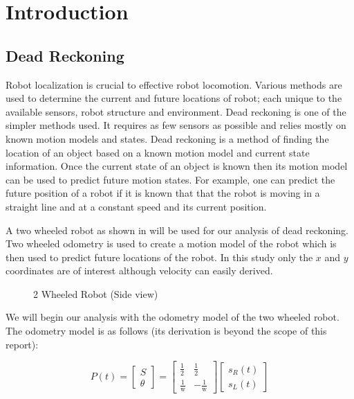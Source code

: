 \documentclass[main.tex]{subfiles}
\begin{document}
\section{Introduction}

\subsection{Dead Reckoning}


Robot localization is crucial to effective robot locomotion. Various methods are
used to determine the current and future locations of robot; each unique to the
available sensors, robot structure and environment. Dead reckoning is one of the
simpler methods used. It requires as few sensors as possible and relies mostly
on known motion models and states.  Dead reckoning is a method of finding the
location of an object based on a known motion model and current state
information. Once the current state of an object is known then its motion model
can be used to predict future motion states. For example, one can predict the
future position of a robot if it is known that that the robot is moving in a
straight line and at a constant speed and its current position.

A two wheeled robot as shown in  will be used for our analysis
of dead reckoning. Two wheeled odometry is used to create a motion model of the
robot which is then used to predict future locations of the robot. In this study
only the $x$ and $y$ coordinates are of interest although velocity can easily
derived. 

\begin{figure}[H]
\begin{center}

\end{center}
\caption{2 Wheeled Robot (Side view)}
\label{fig:2wheelBot}
\end{figure}

We will begin our analysis with the odometry model of the two wheeled robot. The
odometry model is as follows (its derivation is beyond the scope of this
report):

\begin{equation}
\label{eq:deadReckonState}
	P(t) = 
	\begin{bmatrix}
	S \\ \theta
	\end{bmatrix}
	=
	\begin{bmatrix}
	\frac{1}{2}	& \frac{1}{2} \\[0.3em]
	\frac{1}{\mathrm{w}} & -\frac{1}{\mathrm{w}}
	\end{bmatrix} 
	\begin{bmatrix}
	s_R(t) \\ s_L(t)
	\end{bmatrix}
\end{equation}
\end{document}
